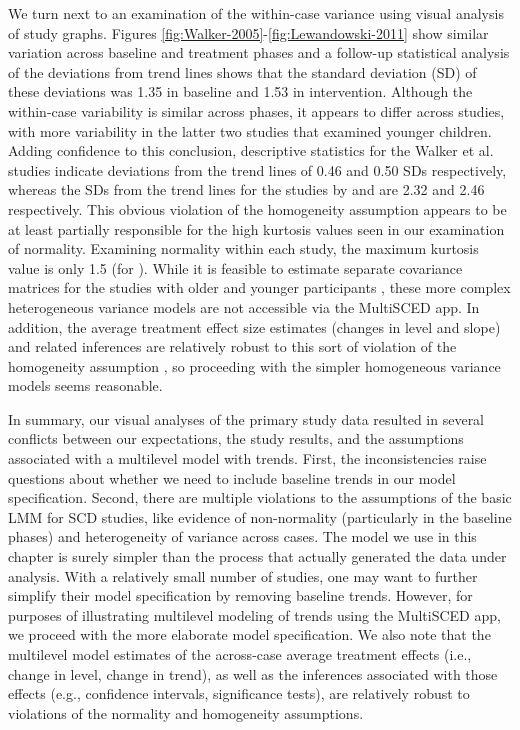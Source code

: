 \documentclass[
]{book}
\begin{document}
We turn next to an examination of the within-case variance using visual analysis of study graphs. Figures \ref{fig:Walker-2005}-\ref{fig:Lewandowski-2011} show similar variation across baseline and treatment phases and a follow-up statistical analysis of the deviations from trend lines shows that the standard deviation (SD) of these deviations was 1.35 in baseline and 1.53 in intervention. Although the within-case variability is similar across phases, it appears to differ across studies, with more variability in the latter two studies that examined younger children. Adding confidence to this conclusion, descriptive statistics for the Walker et al. \citeyearpar[-\citet{walker2007improving}]{walker2005using} studies indicate deviations from the trend lines of 0.46 and 0.50 SDs respectively, whereas the SDs from the trend lines for the studies by \citet{stotz2008Effects} and \citet{lewandowski2011effects} are 2.32 and 2.46 respectively. This obvious violation of the homogeneity assumption appears to be at least partially responsible for the high kurtosis values seen in our examination of normality. Examining normality within each study, the maximum kurtosis value is only 1.5 (for \citet{walker2005using}). While it is feasible to estimate separate covariance matrices for the studies with older and younger participants \citep{baek2016using, baek_Ferron_2020}, these more complex heterogeneous variance models are not accessible via the MultiSCED app. In addition, the average treatment effect size estimates (changes in level and slope) and related inferences are relatively robust to this sort of violation of the homogeneity assumption \citep{baek_Ferron_2020}, so proceeding with the simpler homogeneous variance models seems reasonable.

In summary, our visual analyses of the primary study data resulted in several conflicts between our expectations, the study results, and the assumptions associated with a multilevel model with trends. First, the inconsistencies raise questions about whether we need to include baseline trends in our model specification. Second, there are multiple violations to the assumptions of the basic LMM for SCD studies, like evidence of non-normality (particularly in the baseline phases) and heterogeneity of variance across cases. The model we use in this chapter is surely simpler than the process that actually generated the data under analysis. With a relatively small number of studies, one may want to further simplify their model specification by removing baseline trends. However, for purposes of illustrating multilevel modeling of trends using the MultiSCED app, we proceed with the more elaborate model specification. We also note that the multilevel model estimates of the across-case average treatment effects (i.e., change in level, change in trend), as well as the inferences associated with those effects (e.g., confidence intervals, significance tests), are relatively robust to violations of the normality and homogeneity assumptions.
\end{document}
